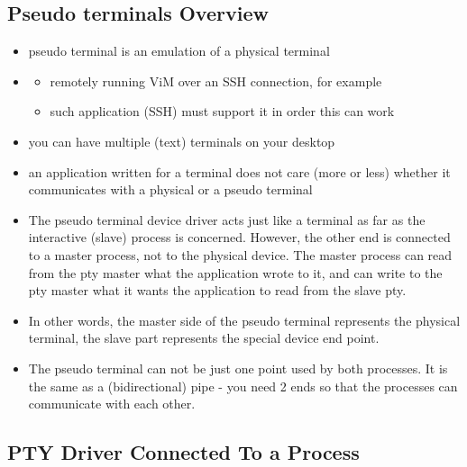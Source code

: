 \subsection{Pseudo terminals Overview}

\begin{itemize}
\item pseudo terminal is an emulation of a physical terminal
\item {}
\begin{itemize}
	\item remotely running ViM over an SSH connection, for example
	\item such application (SSH) must support it in order this can work
\end{itemize}
\item you can have multiple (text) terminals on your desktop
\item an application written for a terminal does not care (more or less) whether
it communicates with a physical or a pseudo terminal
\end{itemize}

\begin{itemize}
\item The pseudo terminal device driver acts just like a terminal as far as the
interactive (slave) process is concerned. However, the other end is connected to
a master process, not to the physical device. The master process can read from
the pty master what the application wrote to it, and can write to the pty master
what it wants the application to read from the slave pty.
\item In other words, the master side of the pseudo terminal represents the
physical terminal, the slave part represents the special device end point.
\item The pseudo terminal can not be just one point used by both processes. It
is the same as a (bidirectional) pipe - you need 2 ends so that the processes
can communicate with each other.
\end{itemize}

\subsection{PTY Driver Connected To a Process}

